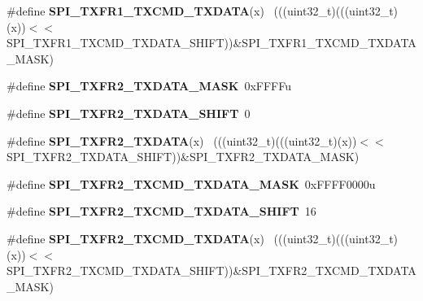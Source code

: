 \begin{DoxyCompactItemize}
\item 
\hypertarget{group___s_p_i___register___masks_gae977c9ab89b38c8398b28ab6fff430a9}{}\#define {\bfseries S\+P\+I\+\_\+\+T\+X\+F\+R1\+\_\+\+T\+X\+C\+M\+D\+\_\+\+T\+X\+D\+A\+T\+A}(x)                            ~(((uint32\+\_\+t)(((uint32\+\_\+t)(x))$<$$<$S\+P\+I\+\_\+\+T\+X\+F\+R1\+\_\+\+T\+X\+C\+M\+D\+\_\+\+T\+X\+D\+A\+T\+A\+\_\+\+S\+H\+I\+F\+T))\&S\+P\+I\+\_\+\+T\+X\+F\+R1\+\_\+\+T\+X\+C\+M\+D\+\_\+\+T\+X\+D\+A\+T\+A\+\_\+\+M\+A\+S\+K)\label{group___s_p_i___register___masks_gae977c9ab89b38c8398b28ab6fff430a9}

\item 
\hypertarget{group___s_p_i___register___masks_ga5af82cbc997e329e1c914390f4a46ddf}{}\#define {\bfseries S\+P\+I\+\_\+\+T\+X\+F\+R2\+\_\+\+T\+X\+D\+A\+T\+A\+\_\+\+M\+A\+S\+K}~0x\+F\+F\+F\+Fu\label{group___s_p_i___register___masks_ga5af82cbc997e329e1c914390f4a46ddf}

\item 
\hypertarget{group___s_p_i___register___masks_ga563b2a2513ee7f9ba76d56405bfaa053}{}\#define {\bfseries S\+P\+I\+\_\+\+T\+X\+F\+R2\+\_\+\+T\+X\+D\+A\+T\+A\+\_\+\+S\+H\+I\+F\+T}~0\label{group___s_p_i___register___masks_ga563b2a2513ee7f9ba76d56405bfaa053}

\item 
\hypertarget{group___s_p_i___register___masks_gada18fb71f3676817423d036206da6b40}{}\#define {\bfseries S\+P\+I\+\_\+\+T\+X\+F\+R2\+\_\+\+T\+X\+D\+A\+T\+A}(x)                                        ~(((uint32\+\_\+t)(((uint32\+\_\+t)(x))$<$$<$S\+P\+I\+\_\+\+T\+X\+F\+R2\+\_\+\+T\+X\+D\+A\+T\+A\+\_\+\+S\+H\+I\+F\+T))\&S\+P\+I\+\_\+\+T\+X\+F\+R2\+\_\+\+T\+X\+D\+A\+T\+A\+\_\+\+M\+A\+S\+K)\label{group___s_p_i___register___masks_gada18fb71f3676817423d036206da6b40}

\item 
\hypertarget{group___s_p_i___register___masks_ga7b74d7b06c2d79ce4f3f5171e63a66f6}{}\#define {\bfseries S\+P\+I\+\_\+\+T\+X\+F\+R2\+\_\+\+T\+X\+C\+M\+D\+\_\+\+T\+X\+D\+A\+T\+A\+\_\+\+M\+A\+S\+K}~0x\+F\+F\+F\+F0000u\label{group___s_p_i___register___masks_ga7b74d7b06c2d79ce4f3f5171e63a66f6}

\item 
\hypertarget{group___s_p_i___register___masks_ga8093c55dfe44be309ef0286209361f0e}{}\#define {\bfseries S\+P\+I\+\_\+\+T\+X\+F\+R2\+\_\+\+T\+X\+C\+M\+D\+\_\+\+T\+X\+D\+A\+T\+A\+\_\+\+S\+H\+I\+F\+T}~16\label{group___s_p_i___register___masks_ga8093c55dfe44be309ef0286209361f0e}

\item 
\hypertarget{group___s_p_i___register___masks_gaa913b618de5d0a87c2a47f04b2bfb1ac}{}\#define {\bfseries S\+P\+I\+\_\+\+T\+X\+F\+R2\+\_\+\+T\+X\+C\+M\+D\+\_\+\+T\+X\+D\+A\+T\+A}(x)                            ~(((uint32\+\_\+t)(((uint32\+\_\+t)(x))$<$$<$S\+P\+I\+\_\+\+T\+X\+F\+R2\+\_\+\+T\+X\+C\+M\+D\+\_\+\+T\+X\+D\+A\+T\+A\+\_\+\+S\+H\+I\+F\+T))\&S\+P\+I\+\_\+\+T\+X\+F\+R2\+\_\+\+T\+X\+C\+M\+D\+\_\+\+T\+X\+D\+A\+T\+A\+\_\+\+M\+A\+S\+K)\label{group___s_p_i___register___masks_gaa913b618de5d0a87c2a47f04b2bfb1ac}


\end{DoxyCompactItemize}
